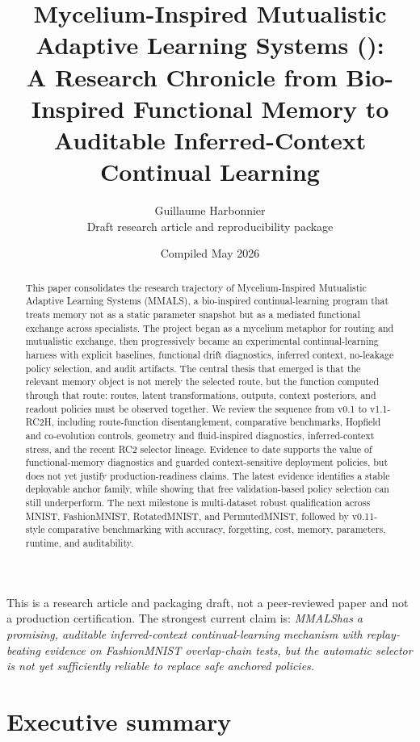 \documentclass[11pt]{article}
\title{\Large Mycelium-Inspired Mutualistic Adaptive Learning Systems (\mmals):\\
A Research Chronicle from Bio-Inspired Functional Memory to Auditable Inferred-Context Continual Learning}
\author{Guillaume Harbonnier\\\small Draft research article and reproducibility package}
\date{Compiled May 2026}
\newcommand{\mmals}{\textsc{MMALS}}
\begin{document}
\maketitle

\begin{abstract}
This paper consolidates the research trajectory of Mycelium-Inspired Mutualistic Adaptive Learning Systems (\mmals), a bio-inspired continual-learning program that treats memory not as a static parameter snapshot but as a mediated functional exchange across specialists. The project began as a mycelium metaphor for routing and mutualistic exchange, then progressively became an experimental continual-learning harness with explicit baselines, functional drift diagnostics, inferred context, no-leakage policy selection, and audit artifacts. The central thesis that emerged is that the relevant memory object is not merely the selected route, but the function computed through that route: routes, latent transformations, outputs, context posteriors, and readout policies must be observed together. We review the sequence from v0.1 to v1.1-RC2H, including route-function disentanglement, comparative benchmarks, Hopfield and co-evolution controls, geometry and fluid-inspired diagnostics, inferred-context stress, and the recent RC2 selector lineage. Evidence to date supports the value of functional-memory diagnostics and guarded context-sensitive deployment policies, but does not yet justify production-readiness claims. The latest evidence identifies a stable deployable anchor family, while showing that free validation-based policy selection can still underperform. The next milestone is multi-dataset robust qualification across MNIST, FashionMNIST, RotatedMNIST, and PermutedMNIST, followed by v0.11-style comparative benchmarking with accuracy, forgetting, cost, memory, parameters, runtime, and auditability.
\end{abstract}

\begin{claimbox}
This is a research article and packaging draft, not a peer-reviewed paper and not a production certification. The strongest current claim is: \emph{\mmals has a promising, auditable inferred-context continual-learning mechanism with replay-beating evidence on FashionMNIST overlap-chain tests, but the automatic selector is not yet sufficiently reliable to replace safe anchored policies.}
\end{claimbox}

\tableofcontents
\newpage

\section{Executive summary}
\end{document}
